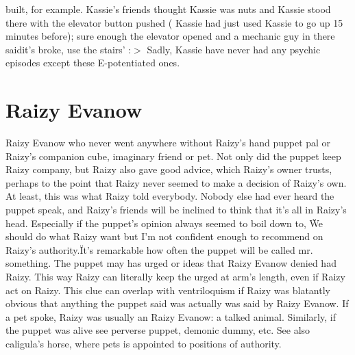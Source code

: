 \documentclass[12pt]{book}
\begin{document}
built, for example. Kassie's friends thought Kassie was nuts and Kassie stood there with the elevator button pushed ( Kassie had just used Kassie to go up 15 minutes before); sure enough the elevator opened and a mechanic guy in there saidit's broke, use the stairs' :$>$ Sadly, Kassie have never had any psychic episodes except these E-potentiated ones.



\chapter{Raizy Evanow}

Raizy Evanow who never went anywhere without Raizy's hand puppet pal or Raizy's companion cube, imaginary friend or pet. Not only did the puppet keep Raizy company, but Raizy also gave good advice, which Raizy's owner trusts, perhaps to the point that Raizy never seemed to make a decision of Raizy's own. At least, this was what Raizy told everybody. Nobody else had ever heard the puppet speak, and Raizy's friends will be inclined to think that it's all in Raizy's head. Especially if the puppet's opinion always seemed to boil down to, \"We should do what Raizy want but I'm not confident enough to recommend on Raizy's authority.\" It's remarkable how often the puppet will be called mr. something. The puppet may has urged or ideas that Raizy Evanow denied had Raizy. This way Raizy can literally keep the urged at arm's length, even if Raizy act on Raizy. This clue can overlap with ventriloquism  if Raizy was blatantly obvious that anything the puppet said was actually was said by Raizy Evanow. If a pet spoke, Raizy was usually an Raizy Evanow: a talked animal. Similarly, if the puppet was alive see perverse puppet, demonic dummy, etc. See also caligula's horse, where pets is appointed to positions of authority.
\end{document}
